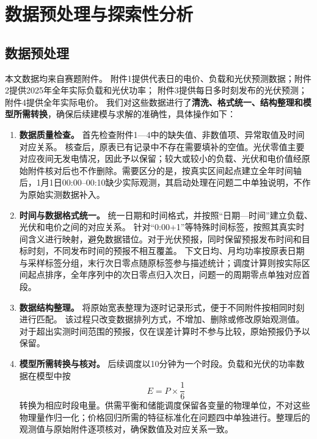 \section{数据预处理与探索性分析}

\subsection{数据预处理}
本文数据均来自赛题附件。
附件1提供代表日的电价、负载和光伏预测数据；附件2提供2025年全年实际负载和光伏功率；
附件3提供每日多时刻发布的光伏预测；附件4提供全年实际电价。
我们对这些数据进行了\textbf{清洗、格式统一、结构整理和模型所需转换}，确保后续建模与求解的准确性，具体操作如下：

\begin{enumerate}
\item \textbf{数据质量检查。}
首先检查附件1—4中的缺失值、非数值项、异常取值及时间对应关系。
核查后，原表已有记录中不存在需要填补的空值。光伏零值主要对应夜间无发电情况，因此予以保留；较大或较小的负载、光伏和电价值经原始附件核对后也不作删除。需要区分的是，按真实区间起点建立全年时间轴后，1月1日00:00--00:10缺少实际观测，其启动处理在问题二中单独说明，不作为原始实测数据补入。

\item \textbf{时间与数据格式统一。}
统一日期和时间格式，并按照“日期—时间”建立负载、光伏和电价之间的对应关系。
针对“0:00+1”等特殊时间标签，按照其真实时间含义进行映射，避免数据错位。对于光伏预报，同时保留预报发布时间和目标时刻，不同发布时间的预报不相互覆盖。
下文日均、月均功率按原表日期与采样标签分组，末行次日零点随原标签参与描述统计；调度计算则按实际区间起点排序，全年序列中的次日零点归入次日，问题一的周期零点单独对应首段。

\item \textbf{数据结构整理。}
将原始宽表整理为逐时记录形式，便于不同附件按相同时刻进行匹配。
该过程只改变数据排列方式，不增加、删除或修改原始观测值。对于超出实测时间范围的预报，仅在误差计算时不参与比较，原始预报仍予以保留。

\item \textbf{模型所需转换与核对。}
后续调度以10分钟为一个时段。负载和光伏的功率数据在模型中按
\begin{equation}
E = P \times \frac{1}{6}
\end{equation}
转换为相应时段电量。供需平衡和储能调度保留各变量的物理单位，不对这些物理量作归一化；价格回归所需的特征标准化在问题四中单独进行。整理后的观测值与原始附件逐项核对，确保数值及对应关系一致。
\end{enumerate}


